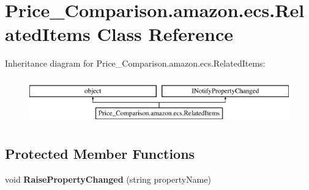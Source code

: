 \hypertarget{class_price___comparison_1_1amazon_1_1ecs_1_1_related_items}{\section{Price\-\_\-\-Comparison.\-amazon.\-ecs.\-Related\-Items Class Reference}
\label{class_price___comparison_1_1amazon_1_1ecs_1_1_related_items}
}


 


Inheritance diagram for Price\-\_\-\-Comparison.\-amazon.\-ecs.\-Related\-Items\-:\begin{figure}[H]
\begin{center}
\leavevmode
\includegraphics[height=2.000000cm]{class_price___comparison_1_1amazon_1_1ecs_1_1_related_items}
\end{center}
\end{figure}
\subsection*{Protected Member Functions}
\begin{DoxyCompactItemize}
\item 
\hypertarget{class_price___comparison_1_1amazon_1_1ecs_1_1_related_items_a3ce76908e8758a9f9b3e00e4df402dcf}{void {\bfseries Raise\-Property\-Changed} (string property\-Name)}\label{class_price___comparison_1_1amazon_1_1ecs_1_1_related_items_a3ce76908e8758a9f9b3e00e4df402dcf}

\end{DoxyCompactItemize}
